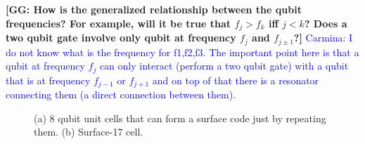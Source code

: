 \documentclass[11pt]{article}
\def\noteGG#1{\textbf{\color{red}[GG: #1]}}
\begin{document}
\noteGG{How is the generalized relationship between the qubit frequencies? For example, will it be true that $f_j>f_k$ iff $j<k$? Does a two qubit gate involve only qubit at frequency $f_j$ and $f_{j\pm 1}$?}
\textcolor{blue}{Carmina: I do not know what is the frequency for f1,f2,f3. The important point here is that a qubit at frequency $f_j$ can only interact (perform a two qubit gate) with a qubit that is at frequency $f_{j-1}$ or $f_{j+1}$ and on top of that there is a resonator connecting them (a direct connection between them).}


\begin{figure}[h!]
\centerline{
}
\caption{(a) 8 qubit unit cells that can form a surface code just by repeating them. (b) Surface-17 cell.}
\label{Surface17}
\end{figure}
\end{document}
